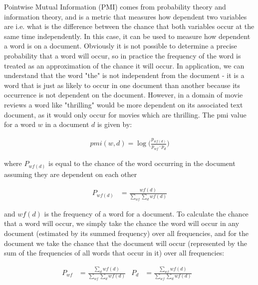 
Pointwise Mutual Information (PMI) comes from probability theory and information theory, and is a metric that measures how dependent  two variables are i.e. what is the difference between the chance that both variables occur at the same time independently. In this case, it can be used to measure how dependent a word is on a document. Obviously it is not possible to determine a precise probability that a word will occur, so in practice the frequency of the word is treated as an approximation of the chance it will occur. In application, we can understand that the word "the" is not independent from the document - it is a word that is just as likely to occur in one document than another because its occurrence is not dependent on the document. However, in a domain of movie reviews a word like "thrilling" would be more dependent on its associated text document, as it would only occur for movies which are thrilling. The pmi value for a word $w$ in a document  $d$ is given by:


\begin{align*}
\textit{pmi}(w, d) = \log\big(\frac{p_{{wf}(d)}}{p_{wf} \cdotp p_{d}}\big)
\end{align*}

where $P_{{wf}(d)}$ is equal to the chance of the word occurring in the document assuming they are dependent on each other 



\begin{align*}
P_{{wf}(d)} &= \frac{{wf}(d)}{\sum_{wf} \sum_{d} {wf}(d)}
\end{align*}

and ${wf}(d)$ is the frequency of a word for a document. To calculate the chance that a word will occur, we simply take the chance the word will occur in any document (estimated by its summed frequency) over all frequencies, and for the document we take the chance that the document  will occur (represented by the sum of the  frequencies of all words that occur in it) over all frequencies:
 
 \begin{align*}
 P_{wf} &= \frac{\sum_{d} {wf}(d)}{\sum_{wf} \sum_{d} {wf}(d)} &
 P_{d} &= \frac{\sum_{wf} {wf}(d)}{\sum_{wf} \sum_{d} {wf}(d)} &
 \end{align*}
 


